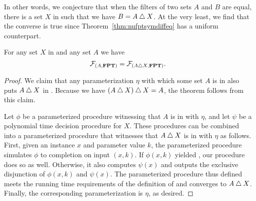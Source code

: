 In other words, we conjecture that when the filters of two sets $A$ and $B$ are equal, there is a set $X$ in  such that we have $B = A \bigtriangleup X$.
At the very least, we find that the converse is true since Theorem~\ref{thm:nufptsymdiffeq} has a uniform counterpart.
\begin{theorem}
  For any set $X$ in  and any set $A$ we have
  \begin{equation*}
    \mathcal{F}_{(A, \textnormal{\textbf{FPT}})} = \mathcal{F}_{(A \bigtriangleup X, \textnormal{\textbf{FPT}})}.
  \end{equation*}
\end{theorem}
\begin{proof}
  We claim that any parameterization $\eta$ with which some set $A$ is in  also puts $A \bigtriangleup X$ in .
  Because we have $(A \bigtriangleup X) \bigtriangleup X = A$, the theorem follows from this claim.

  Let $\phi$ be a parameterized procedure witnessing that $A$ is in  with $\eta$, and let $\psi$ be a polynomial time decision procedure for $X$.
  These procedures can be combined into a parameterized procedure that witnesses that $A \bigtriangleup X$ is in  with $\eta$ as follows.
  First, given an instance $x$ and parameter value $k$, the parameterized procedure simulates $\phi$ to completion on input $(x, k)$.
  If $\phi(x, k)$ yielded , our procedure does so as well.
  Otherwise, it also computes $\psi(x)$ and outputs the exclusive disjunction of $\phi(x, k)$ and $\psi(x)$.
  The parameterized procedure thus defined meets the running time requirements of the definition of  and converges to $A \bigtriangleup X$.
  Finally, the corresponding parameterization is $\eta$, as desired.
\end{proof}

